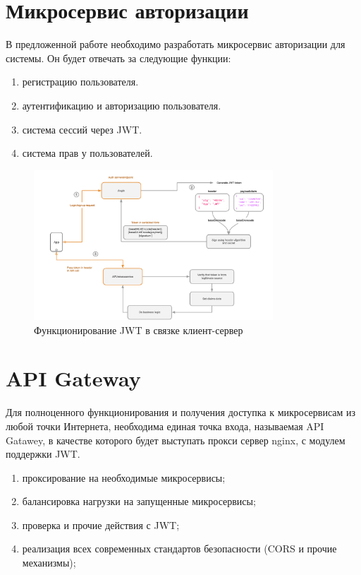 \section{Микросервис авторизации}

В предложенной работе необходимо разработать микросервис авторизации для системы. Он будет отвечать за следующие функции: 

\begin{enumerate}
    \item регистрацию пользователя.
    \item аутентификацию и авторизацию пользователя.
    \item система сессий через JWT.
    \item система прав у пользователей.
\end{enumerate}

\begin{figure}
  \centering
  \includegraphics[width=0.8\textwidth]{graphics/img/jwt.png}
  \caption{Функционирование JWT в связке клиент-сервер}
  \label{fig:jwt}
\end{figure}


\section{API Gateway}
Для полноценного функционирования и получения доступка к микросервисам из любой точки Интернета, необходима единая точка входа, называемая API Gatawey, в качестве которого будет выступать прокси сервер nginx, с модулем поддержки JWT. \cite{arch:api}
\begin{enumerate}
    \item проксирование на необходимые микросервисы;
    \item балансировка нагрузки на запущенные микросервисы;
    \item проверка и прочие действия с JWT;
    \item реализация всех современных стандартов безопасности (CORS и прочие механизмы);
\end{enumerate}

